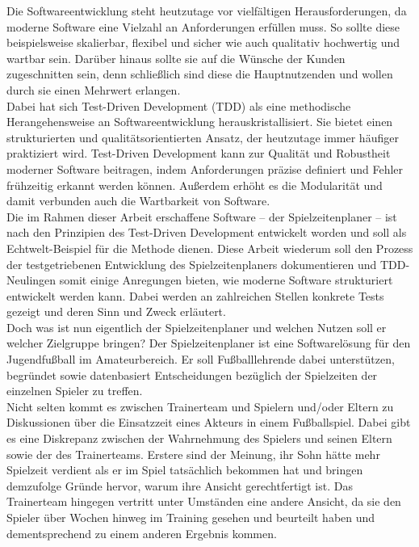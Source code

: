 
Die Softwareentwicklung steht heutzutage vor vielfältigen Herausforderungen, da moderne 
Software eine Vielzahl an Anforderungen erfüllen muss. So sollte diese beispielsweise 
skalierbar, flexibel und sicher wie auch qualitativ hochwertig und wartbar sein. 
Darüber hinaus sollte sie auf die Wünsche der Kunden zugeschnitten sein, denn schließlich 
sind diese die Hauptnutzenden und wollen durch sie einen Mehrwert erlangen. \\ 
Dabei hat sich Test-Driven Development (TDD) als eine methodische Herangehensweise an 
Softwareentwicklung herauskristallisiert. Sie bietet einen strukturierten und 
qualitätsorientierten Ansatz, der heutzutage immer häufiger praktiziert wird. 
Test-Driven Development kann zur Qualität und Robustheit moderner Software beitragen, 
indem Anforderungen präzise definiert und Fehler frühzeitig erkannt werden können. 
Außerdem erhöht es die Modularität und damit verbunden auch die Wartbarkeit von 
Software. \\ 
Die im Rahmen dieser Arbeit erschaffene Software -- der Spielzeitenplaner -- ist nach 
den Prinzipien des Test-Driven Development entwickelt worden und soll als 
Echtwelt-Beispiel für die Methode dienen. Diese Arbeit wiederum soll den Prozess der 
testgetriebenen Entwicklung des Spielzeitenplaners dokumentieren und TDD-Neulingen somit 
einige Anregungen bieten, wie moderne Software strukturiert entwickelt werden kann. 
Dabei werden an zahlreichen Stellen konkrete Tests gezeigt und deren Sinn und Zweck 
erläutert. \\ 
Doch was ist nun eigentlich der Spielzeitenplaner und welchen Nutzen soll er welcher 
Zielgruppe bringen? Der Spielzeitenplaner ist eine Softwarelösung für den Jugendfußball 
im Amateurbereich. Er soll Fußballlehrende dabei unterstützen, begründet sowie 
datenbasiert Entscheidungen bezüglich der Spielzeiten der einzelnen Spieler zu 
treffen. \\ 
Nicht selten kommt es zwischen Trainerteam und Spielern und/oder Eltern zu Diskussionen 
über die Einsatzzeit eines Akteurs in einem Fußballspiel. Dabei gibt es eine Diskrepanz 
zwischen der Wahrnehmung des Spielers und seinen Eltern sowie der des Trainerteams. 
Erstere sind der Meinung, ihr Sohn hätte mehr Spielzeit verdient als er im Spiel 
tatsächlich bekommen hat und bringen demzufolge Gründe hervor, warum ihre Ansicht 
gerechtfertigt ist. Das Trainerteam hingegen vertritt unter Umständen eine andere 
Ansicht, da sie den Spieler über Wochen hinweg im Training gesehen und beurteilt 
haben und dementsprechend zu einem anderen Ergebnis kommen. \\ 
